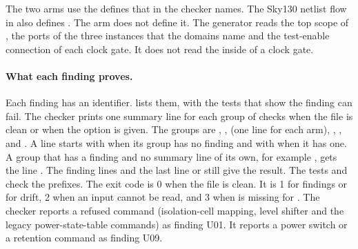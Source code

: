 The two arms use the defines that  in the checker names. The Sky130 netlist flow in  also defines . The arm  does not define it. The generator reads the top scope of , the ports of the three instances that the domains name and the test-enable connection of each clock gate. It does not read the inside of a clock gate.

\paragraph{What each finding proves.} Each finding has an identifier.  lists them, with the tests that show the finding can fail. The checker prints one summary line for each group of checks when the file is clean or when the option  is given. The groups are , ,  (one line for each arm), , ,  and . A line starts with  when its group has no finding and with  when it has one. A group that has a finding and no summary line of its own, for example , gets the line . The finding lines and the last line  or  still give the result. The tests  and  check the prefixes. The exit code is 0 when the file is clean. It is 1 for findings or for drift, 2 when an input cannot be read, and 3 when  is missing for . The checker reports a refused command (isolation-cell mapping, level shifter and the legacy power-state-table commands) as finding U01. It reports a power switch or a retention command as finding U09.

